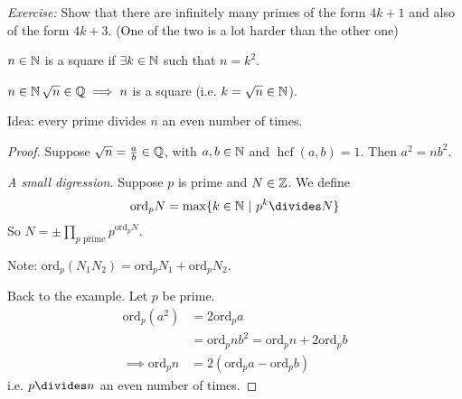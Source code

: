 \documentclass[twoside]{scrartcl}
\DeclareMathOperator{\hcf}{hcf}
\begin{document}
\emph{Exercise:} Show that there are infinitely many primes of the form $4k+1$ and also of the form $4k+3$. (One of the two is a lot harder than the other one) \\

\vspace*{5pt}

\begin{definition}  
$n \in\mathbb{N}$ is a square if $\exists k \in\mathbb{N}$ such that $n = k^2$.	
\end{definition}\vspace*{5pt}

\begin{example}
$n \in\mathbb{N}\, \sqrt{n} \in\mathbb{Q} \implies n$ is a square (i.e. $k = \sqrt{n} \in\mathbb{N}$). 

Idea: every prime divides $n$ an even number of times. 

\begin{proof}
Suppose $\sqrt{n} = \frac{a}{b} \in\mathbb{Q}$, with $a,b \in\mathbb{N}$ and $\hcf(a,b) = 1$. Then $a^2 = nb^2$. 

\emph{A small digression.} Suppose $p$ is prime and $N \in\mathbb{Z}$. We define 
\[\mathrm{ord}_pN = \max\{k\iN ~|~ p^k \divides N \}\]
So $N = \pm \displaystyle{\prod_{p \text{ prime}} p^{\mathrm{ord}_pN}}$. 

Note: $\mathrm{ord}_p(N_1N_2) = \mathrm{ord}_pN_1 + \mathrm{ord}_pN_2$. 

Back to the example. Let $p$ be prime. 
\[
\begin{aligned}
  \mathrm{ord}_p(a^2) &= 2 \mathrm{ord}_pa \\
  &= \mathrm{ord}_pnb^2 = \mathrm{ord}_pn + 2\mathrm{ord}_pb\\
  \implies \mathrm{ord}_pn &= 2(\mathrm{ord}_pa - \mathrm{ord}_pb)
\end{aligned}
\]
i.e. $p \divides n$ an even number of times.
\end{proof}
\end{example}\vspace*{10pt}
\end{document}
